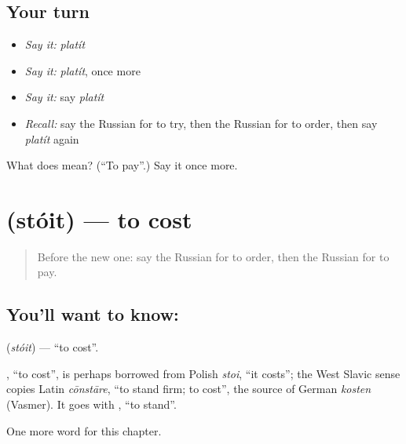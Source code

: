 \subsection*{Your turn}
\begin{itemize}
\raggedright
  \item \emph{Say it:} \emph{platít}
  \item \emph{Say it:} \emph{platít}, once more
  \item \emph{Say it:} say \emph{platít}
  \item \emph{Recall:} say the Russian for to try, then the Russian for to order, then say \emph{platít} again
\end{itemize}

\begin{tcolorbox}[breakable,colback=teal!4,colframe=teal!35!black,title={Before you move on}]
What does  mean? (\textquotedblleft{}To pay\textquotedblright{}.) Say it once more.
\end{tcolorbox}
\section[\texorpdfstring{\ru{стоить} (stóit)}{стоить (stóit)}]{ (stóit) — to cost}

\label{lesson:RU-C204-stoit}



\begin{quote}
Before the new one: say the Russian for to order, then the Russian for to pay.
\end{quote}

\subsection*{You'll want to know: }
\textbf{} (\emph{stóit}) — \textquotedblleft{}to cost\textquotedblright{}.

\begin{cousinweb}
\textbf{}, \textquotedblleft{}to cost\textquotedblright{}, is perhaps borrowed from Polish \emph{stoi}, \textquotedblleft{}it costs\textquotedblright{}; the West Slavic sense copies Latin \emph{cōnstāre}, \textquotedblleft{}to stand firm; to cost\textquotedblright{}, the source of German \emph{kosten} (Vasmer). It goes with \emph{}, \textquotedblleft{}to stand\textquotedblright{}.
\end{cousinweb}

\begin{grammarlens}[title={What you've built}]
One more word for this chapter.
\end{grammarlens}


